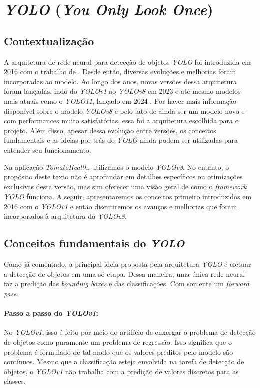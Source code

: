 \section{\emph{YOLO} (\emph{You Only Look Once}) \label{sec:yolo}}
\label{sec:modelo}
\subsection{Contextualização}
A arquitetura de rede neural para detecção de objetos \emph{YOLO} foi introduzida em 2016 com o trabalho de \cite{yolo}. Desde então, diversas evoluções e melhorias foram incorporadas ao modelo. Ao longo dos anos, novas versões dessa arquitetura foram lançadas, indo do \emph{YOLOv1} ao \emph{YOLOv8} em 2023 e até mesmo modelos mais atuais como o \emph{YOLO11}, lançado em 2024 \citep{yolo, yolov8_2023, yolo11_2024}. Por haver mais informação disponível sobre o modelo \emph{YOLOv8} e pelo fato de ainda ser um modelo novo e com performances muito satisfatórias, essa foi a arquitetura escolhida para o projeto. Além disso, apesar dessa evolução entre versões, os conceitos fundamentais e as ideias por trás do \emph{YOLO} ainda podem ser utilizadas para entender seu funcionamento.


Na aplicação \emph{TomatoHealth}, utilizamos o modelo \emph{YOLOv8}. No entanto, o propósito deste texto não é aprofundar em detalhes específicos ou otimizações exclusivas desta versão, mas sim oferecer uma visão geral de como o \emph{framework YOLO} funciona. A seguir, apresentaremos os conceitos primeiro introduzidos em 2016 com o \emph{YOLOv1} e então discutiremos os avanços e melhorias que foram incorporados à arquitetura do \emph{YOLOv8}.

\subsection{Conceitos fundamentais do \emph{YOLO}}
Como já comentado, a principal ideia proposta pela arquitetura \emph{YOLO} é efetuar a detecção de objetos em uma só etapa. Dessa maneira, uma única rede neural faz a predição das \emph{bounding boxes} e das classificações. Com somente um \emph{forward pass}.

\paragraph{Passo a passo do \emph{YOLOv1}:}
No \emph{YOLOv1}, isso é feito por meio do artifício de enxergar o problema de detecção de objetos como puramente um problema de regressão. Isso significa que o problema é formulado de tal modo que os valores preditos pelo modelo são contínuos. Mesmo que a classificação esteja envolvida na tarefa de detecção de objetos, o \emph{YOLOv1} não trabalha com a predição de valores discretos para as classes.

